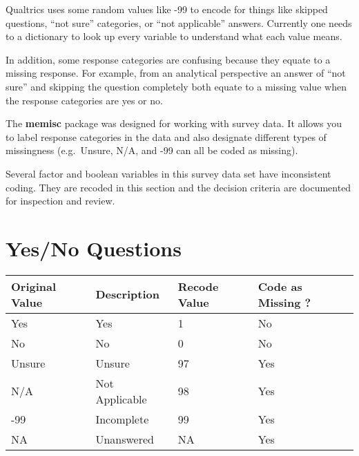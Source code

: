 \documentclass[
  letterpaper,
]{scrbook}
\begin{document}
Qualtrics uses some random values like -99 to encode for things like
skipped questions, ``not sure'' categories, or ``not applicable''
answers. Currently one needs to a dictionary to look up every variable
to understand what each value means.

In addition, some response categories are confusing because they equate
to a missing response. For example, from an analytical perspective an
answer of ``not sure'' and skipping the question completely both equate
to a missing value when the response categories are yes or no.

The \textbf{memisc} package was designed for working with survey data.
It allows you to label response categories in the data and also
designate different types of missingness (e.g.~Unsure, N/A, and -99 can
all be coded as missing).

Several factor and boolean variables in this survey data set have
inconsistent coding. They are recoded in this section and the decision
criteria are documented for inspection and review.

\chapter{Yes/No Questions}\label{yesno-questions-1}

\begin{longtable}[]{@{}llll@{}}
\toprule\noalign{}
Original Value & Description & Recode Value & Code as Missing ? \\
\midrule\noalign{}
\endhead
\bottomrule\noalign{}
\endlastfoot
Yes & Yes & 1 & No \\
No & No & 0 & No \\
Unsure & Unsure & 97 & Yes \\
N/A & Not Applicable & 98 & Yes \\
-99 & Incomplete & 99 & Yes \\
NA & Unanswered & NA & Yes \\
\end{longtable}
\end{document}
